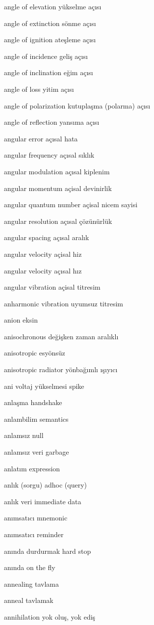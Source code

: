 \documentclass[12pt,fleqn]{article}\usepackage{../../common}
\begin{document}
angle of elevation yükselme açısı

angle of extinction sönme açısı

angle of ignition ateşleme açısı

angle of incidence geliş açısı

angle of inclination eğim açısı

angle of loss yitim açısı

angle of polarization kutuplaşma (polarma) açısı

angle of reflection yansıma açısı

angular error açısal hata

angular frequency açısal sıklık

angular modulation açısal kiplenim

angular momentum açisal devinirlik

angular quantum number açisal nicem sayisi

angular resolution açısal çözünürlük

angular spacing açısal aralık

angular velocity açisal hiz

angular velocity açısal hız

angular vibration açisal titresim

anharmonic vibration uyumsuz titresim

anion eksin

anisochronous değişken zaman aralıklı

anisotropic esyönsüz

anisotropic radiator yönbağımlı ışıyıcı

ani voltaj yükselmesi spike

anlaşma handshake

anlambilim semantics

anlamsız null

anlamsız veri garbage

anlatım expression

anlık (sorgu) adhoc (query)

anlık veri immediate data

anımsatıcı mnemonic

anımsatıcı reminder

anında durdurmak hard stop

anında on the fly

annealing tavlama

anneal tavlamak

annihilation yok oluş, yok ediş
\end{document}
